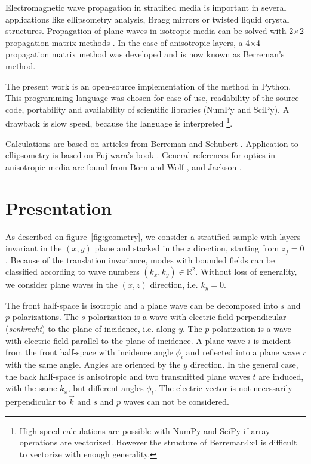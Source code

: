

Electromagnetic wave propagation in stratified media is important in several applications like ellipsometry analysis, Bragg mirrors or twisted liquid crystal structures.
Propagation of plane waves in isotropic media can be solved with 2$\times$2 propagation matrix methods \cite{BornWolf}.
In the case of anisotropic layers, a 4$\times$4 propagation matrix method was developed \cite{1970_TeilerHenvis, Berreman} and is now known as Berreman's method. 

The present work is an open-source implementation of the method in Python.
This programming language was chosen for ease of use, readability of the source code, portability and availability of scientific libraries (NumPy and SciPy).
A drawback is slow speed, because the language is interpreted%
\footnote{%
High speed calculations are possible with NumPy and SciPy if array operations are vectorized.
However the structure of Berreman4x4 is difficult to vectorize with enough generality.}.

Calculations are based on articles from Berreman \cite{Berreman} and Schubert \cite{Schubert}.
Application to ellipsometry is based on Fujiwara's book \cite{Fujiwara}.
General references for optics in anisotropic media are found from Born and Wolf \cite{BornWolf}, and Jackson \cite{Jackson}.

\section{Presentation}

As described on figure~\ref{fig:geometry}, we consider a stratified sample with layers invariant in the $(x,y)$ plane and stacked in the $z$ direction, starting from $z_f=0$.
Because of the translation invariance, modes with bounded fields can be classified according to wave numbers $(k_x,k_y)\in\mathbb{R}^2$.
Without loss of generality, we consider plane waves in the $(x,z)$ direction, i.e. $k_y=0$.

The front half-space is isotropic and a plane wave can be decomposed into $s$ and $p$ polarizations.
The $s$ polarization is a wave with electric field perpendicular (\emph{senkrecht}) to the plane of incidence, i.e. along $y$.
The $p$ polarization is a wave with electric field parallel to the plane of incidence.
A plane wave $i$ is incident from the front half-space with incidence angle $\phi_i$ and reflected into a plane wave $r$ with the same angle.
Angles are oriented by the $y$ direction.
In the general case, the back half-space is anisotropic and two transmitted plane waves $t$ are induced, with the same $k_x$, but different angles $\phi_t$.
The electric vector is not necessarily perpendicular to $\vec k$ and $s$ and $p$ waves can not be considered.

